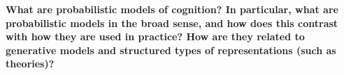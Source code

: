 \documentclass[12pt]{article}
\begin{document}
\textbf{What are probabilistic models of cognition? In particular, what are probabilistic models in the broad sense, and how does this contrast with how they are used in practice? How are they related to generative models and structured types of representations (such as theories)?}

\cite{Anderson1990}


\end{document}
